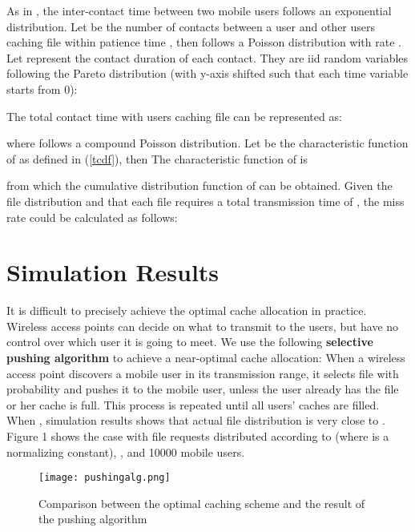 \documentclass{sig-alternate}
\begin{document}
As in \cite{gao2009multicasting}\cite{ioannidis2010distributed}, the inter-contact time between two mobile users follows an exponential distribution. Let  be the number of contacts between a user and other users caching file  within patience time , then  follows a Poisson distribution with rate . Let  represent the contact duration of each contact. They are iid random variables following the Pareto distribution (with y-axis shifted such that each time variable starts from 0): 

The total contact time with users caching file  can be represented as: 



where  follows a compound Poisson distribution. Let  be the characteristic function of  as defined in (\ref{tcdf}), then The characteristic function of  is



from which the cumulative distribution function of  can be obtained. Given the file distribution  and that each file requires a total transmission time of , the miss rate could be calculated as follows:




\section{Simulation Results}

It is difficult to precisely achieve the optimal cache allocation in practice. Wireless access points can decide on what to transmit to the users, but have no control over which user it is going to meet. We use the following \textbf{selective pushing algorithm} to achieve a near-optimal cache allocation: When a wireless access point discovers a mobile user in its transmission range, it selects file  with probability  and pushes it to the mobile user, unless the user already has the file or her cache is full. This process is repeated until all users' caches are filled. When , simulation results shows that actual file distribution is very close to . Figure 1 shows the case with file requests distributed according to  (where  is a normalizing constant), ,  and 10000 mobile users. 



\begin{figure}
	\centering
		\texttt{[image: pushingalg.png]}
	\caption{Comparison between the optimal caching scheme and the result of the pushing algorithm}
	\label{fig:pushingalg}
\end{figure}
\end{document}
